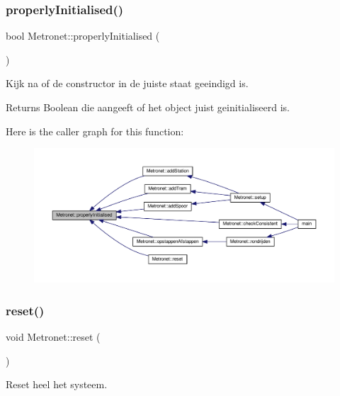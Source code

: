 \subsubsection{\texorpdfstring{properly\+Initialised()}{properlyInitialised()}}
{\footnotesize\ttfamily bool Metronet\+::properly\+Initialised (\begin{DoxyParamCaption}{ }\end{DoxyParamCaption})}



Kijk na of de constructor in de juiste staat geeindigd is. 

\begin{DoxyReturn}{Returns}
Boolean die aangeeft of het object juist geinitialiseerd is. 
\end{DoxyReturn}
Here is the caller graph for this function\+:\nopagebreak
\begin{figure}[H]
\begin{center}
\leavevmode
\includegraphics[width=350pt]{class_metronet_a3d2adce29a947f162924279b766de645_icgraph}
\end{center}
\end{figure}
\mbox{\label{class_metronet_aae72fb7ad05324adb1ccc6a1519c5c0b}} 
\subsubsection{\texorpdfstring{reset()}{reset()}}
{\footnotesize\ttfamily void Metronet\+::reset (\begin{DoxyParamCaption}{ }\end{DoxyParamCaption})}



Reset heel het systeem. 


